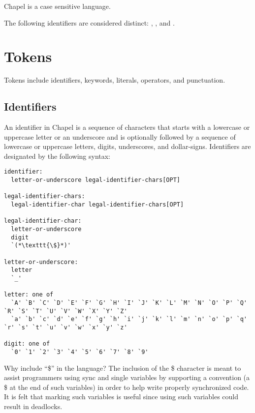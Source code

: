 Chapel is a case sensitive language.

\begin{example}
The following identifiers are considered
distinct: , , and .
\end{example}

\section{Tokens}
\label{Tokens}

Tokens include identifiers, keywords, literals, operators, and
punctuation.

\subsection{Identifiers}
\label{Identifiers}

An identifier in Chapel is a sequence of characters that starts with a
lowercase or uppercase letter or an underscore and is optionally
followed by a sequence of lowercase or uppercase letters, digits,
underscores, and dollar-signs.  Identifiers are designated by the
following syntax:
\begin{syntax}
\begin{verbatim}
identifier:
  letter-or-underscore legal-identifier-chars[OPT]

legal-identifier-chars:
  legal-identifier-char legal-identifier-chars[OPT]

legal-identifier-char:
  letter-or-underscore
  digit
  `(*\texttt{\$}*)'

letter-or-underscore:
  letter
  `_'

letter: one of
  `A' `B' `C' `D' `E' `F' `G' `H' `I' `J' `K' `L' `M' `N' `O' `P' `Q' `R' `S' `T' `U' `V' `W' `X' `Y' `Z'
  `a' `b' `c' `d' `e' `f' `g' `h' `i' `j' `k' `l' `m' `n' `o' `p' `q' `r' `s' `t' `u' `v' `w' `x' `y' `z'

digit: one of
  `0' `1' `2' `3' `4' `5' `6' `7' `8' `9'
\end{verbatim}
\end{syntax}

\begin{rationale}
Why include ``\$'' in the language?  The inclusion of the \$ character
is meant to assist programmers using sync and single variables by
supporting a convention (a \$ at the end of such variables) in order
to help write properly synchronized code.  It is felt that marking
such variables is useful since using such variables could result in
deadlocks.
\end{rationale}

